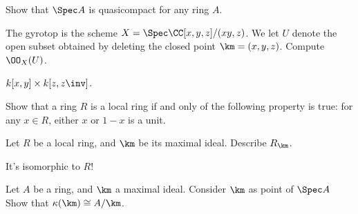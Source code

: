 \begin{dproblem}
	\gim
	Show that $\Spec A$ is quasicompact for any ring $A$.
\end{dproblem}

\begin{problem}
	The gyrotop is the scheme $X = \Spec \CC[x,y,z] / (xy,z)$.
	We let $U$ denote the open subset obtained
	by deleting the closed point $\km = (x,y,z)$.
	Compute $\OO_X(U)$.
	\begin{hint}
		$k[x,y] \times k[z,z\inv]$.
	\end{hint}
\end{problem}

\begin{problem}
	Show that a ring $R$ is a local ring
	if and only of the following property is true:
	for any $x \in R$,
	either $x$ or $1-x$ is a unit.
\end{problem}

\begin{problem}
	Let $R$ be a local ring, and $\km$ be its maximal ideal.
	Describe $R_\km$.
	\begin{hint}
		It's isomorphic to $R$!
	\end{hint}
\end{problem}

\begin{problem}
	Let $A$ be a ring, and $\km$ a maximal ideal.
	Consider $\km$ as point of $\Spec A$
	Show that $\kappa(\km) \cong A/\km$.
\end{problem}
